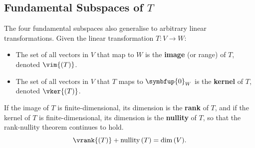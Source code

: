 \documentclass{article}
\DeclareMathOperator*{\nullity}{nullity}
\begin{document}
\subsection{Fundamental Subspaces of \texorpdfstring{\(T\)}{T}}
The four fundamental subspaces also generalise to arbitrary linear
transformations. Given the linear transformation \(T:V \to W\):
\begin{itemize}
    \item The set of all vectors in \(V\) that map to \(W\) is the
          \textbf{image} (or range) of \(T\), denoted \(\vim{\left( T
          \right)}\).
    \item The set of all vectors in \(V\) that \(T\) maps to
          \(\symbfup{0}_W\) is the \textbf{kernel} of \(T\), denoted
          \(\vker{\left( T \right)}\).
\end{itemize}
If the image of \(T\) is finite-dimensional, its dimension is the \textbf{rank} of \(T\), and
if the kernel of \(T\) is finite-dimensional, its dimension is the \textbf{nullity} of \(T\), so
that the rank-nullity theorem continues to hold.
\begin{equation*}
    \vrank{\left( T \right)} + \nullity{\left( T \right)} = \dim{\left( V \right)}.
\end{equation*}
\end{document}
